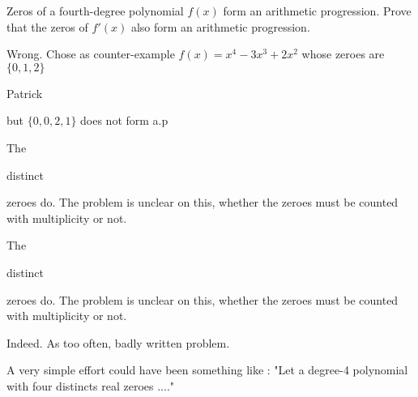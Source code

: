 \begin{solution}
	\begin{tcolorbox}Zeros of a fourth-degree polynomial $f (x)$ form an arithmetic progression. Prove that the zeros of $f '(x)$ also form an arithmetic progression.\end{tcolorbox}
Wrong. Chose as counter-example $f(x)=x^4-3x^3+2x^2$ whose zeroes are $\{0,1,2\}$
\end{solution}



\begin{solution}
	Patrick

but $\{0,0,2,1\}$ does not form a.p
\end{solution}



\begin{solution}
	The \begin{italicized}distinct\end{italicized} zeroes do. The problem is unclear on this, whether the zeroes must be counted with multiplicity or not.
\end{solution}



\begin{solution}
	\begin{tcolorbox}The \begin{italicized}distinct\end{italicized} zeroes do. The problem is unclear on this, whether the zeroes must be counted with multiplicity or not.\end{tcolorbox}
Indeed. As too often, badly written problem.

A very simple effort could have been something like : "Let a degree-4 polynomial with four distincts real zeroes ...."
\end{solution}



